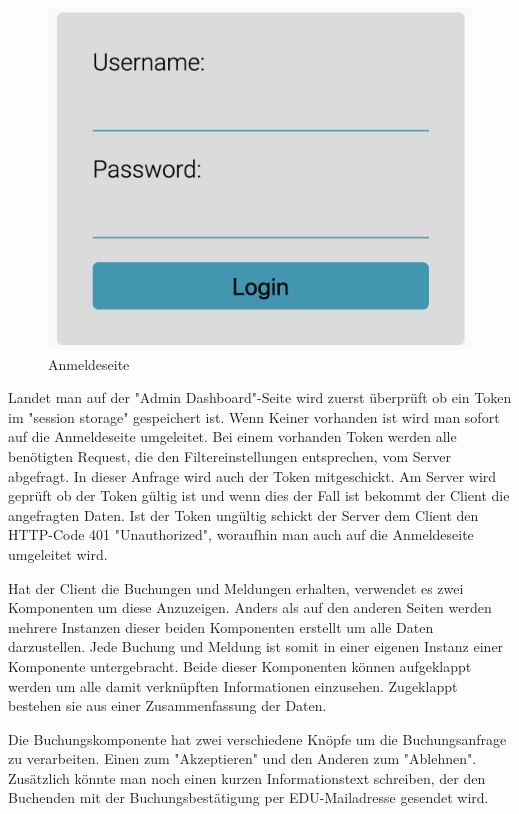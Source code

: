 \begin{figure}[H]
    \centering
    \includegraphics[width=120mm]{media/WebComponents/Login_light.png}
    \caption{Anmeldeseite}
\end{figure}

Landet man auf der "Admin Dashboard"-Seite wird zuerst überprüft ob ein Token im "session storage" gespeichert ist. Wenn Keiner vorhanden ist wird man sofort auf die Anmeldeseite umgeleitet. Bei einem vorhanden Token werden alle benötigten Request, die den Filtereinstellungen entsprechen, vom Server abgefragt. In dieser Anfrage wird auch der Token mitgeschickt. Am Server wird geprüft ob der Token gültig ist und wenn dies der Fall ist bekommt der Client die angefragten Daten. Ist der Token ungültig schickt der Server dem Client den HTTP-Code 401 "Unauthorized", woraufhin man auch auf die Anmeldeseite umgeleitet wird.

Hat der Client die Buchungen und Meldungen erhalten, verwendet es zwei Komponenten um diese Anzuzeigen. Anders als auf den anderen Seiten werden mehrere Instanzen dieser beiden Komponenten erstellt um alle Daten darzustellen. Jede Buchung und Meldung ist somit in einer eigenen Instanz einer Komponente untergebracht. Beide dieser Komponenten können aufgeklappt werden um alle damit verknüpften Informationen einzusehen. Zugeklappt bestehen sie aus einer Zusammenfassung der Daten. 

Die Buchungskomponente hat zwei verschiedene Knöpfe um die Buchungsanfrage zu verarbeiten. Einen zum "Akzeptieren" und den Anderen zum "Ablehnen". Zusätzlich könnte man noch einen kurzen Informationstext schreiben, der den Buchenden mit der Buchungsbestätigung per EDU-Mailadresse gesendet wird. 

